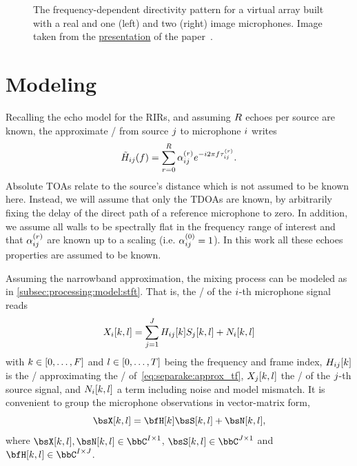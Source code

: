\begin{figure}
    \begin{fullwidth}
    \centering
    \resizebox{\linewidth}{!}{
        
    }
    \caption{The frequency-dependent directivity pattern for a virtual array built with a real and one (left) and two (right) image microphones.
    Image taken from the \href{https://sigport.org/documents/separake-source-separation-little-help-echoes}{presentation} of the paper~.}
    \label{fig:separake:directivity}
    \end{fullwidth}
\end{figure}

\section{Modeling}
Recalling the echo model for the \acp{RIR}, and assuming $R$ echoes per source are known, the approximate \RTFdef/ from source $j$ to microphone $i$ writes
\begin{equation}
    \label{eq:separake:approx_tf}
    \tilde{H}_{ij}(f) = \sum_{r=0}^{R} \alpha_{ij}^{(r)} {e}^{-{i} 2 \pi f \tau_{ij}^{(r)}}.
\end{equation}
Absolute \acsp{TOA} relate to the source's distance which is not assumed to be known here.
Instead, we will assume that only the \acp{TDOA} are known, by arbitrarily fixing the delay of the direct path of a reference microphone to zero.
In addition, we assume all walls to be spectrally flat in the frequency range of interest and that $\alpha_{ij}^{(r)}$ are known up to a scaling (i.e. $\alpha_{ij}^{(0)} = 1$).
In this work all these echoes properties are assumed to be known.

\mynewline
Assuming the narrowband approximation, the mixing process can be modeled as in \cref{subsec:processing:model:stft}.
That is, the \STFTdef/ of the $i$-th microphone signal reads
\begin{equation}
    \label{eq:separake:stft}
    X_{i}[k,l] = \sum_{j = 1}^{J} H_{ij}[k] S_{j}[k,l] + N_{i}[k,l]
\end{equation}
with $k\in\klist{0,\ldots,F}$ and $l\in\klist{0,\ldots,T}$ being the frequency and frame index,
$H_{ij}[k]$ is the \DFT/ approximating the \RTF/ of~\eqref{eq:separake:approx_tf},
$X_{j}[k,l]$ the \STFT/ of the $j$-th source signal, and $N_{i}[k,l]$ a term including noise and model mismatch.
It is convenient to group the microphone observations in vector-matrix form,
\begin{equation}
    \MICS[k,l] = \FLTSS[k]\SRCS[k,l] + \NSES[k,l]
    ,
\end{equation}
where $\MICS[k,l],  \NSES[k,l] \in \bbC^{\numMics \times 1}$, $\SRCS[k,l] \in \bbC^{\numSrcs \times 1}$ and $\FLTSS[k,l] \in \bbC^{\numMics \times \numSrcs}$.

